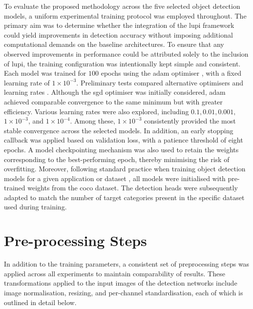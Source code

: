 To evaluate the proposed methodology across the five selected object detection models, a uniform experimental training protocol was employed throughout. The primary aim was to determine whether the integration of the \gls{lupi} framework could yield improvements in detection accuracy without imposing additional computational demands on the baseline architectures. To ensure that any observed improvements in performance could be attributed solely to the inclusion of \gls{lupi}, the training configuration was intentionally kept simple and consistent. Each model was trained for $100$ epochs using the \gls{adam} optimiser \cite{adam_optimizer}, with a fixed learning rate of \(1 \times 10^{-3}\).
Preliminary tests compared alternative optimisers and learning rates \cite{sgd_optimizer}. Although the \gls{sgd} optimiser was initially considered, \gls{adam} achieved comparable convergence to the same minimum but with greater efficiency. Various learning rates were also explored, including $0.1, 0.01, 0.001,$ \(1 \times 10^{-3}\), and \(1 \times 10^{-4}\). Among these, \(1 \times 10^{-3}\) consistently provided the most stable convergence across the selected models. 
In addition, an early stopping callback was applied based on validation loss, with a patience threshold of eight epochs. A model checkpointing mechanism was also used to retain the weights corresponding to the best-performing epoch, thereby minimising the risk of overfitting.
Moreover, following standard practice when training object detection models for a given application or dataset \cite{yolov12, soda_dataset, fasterrcnn, yolov10}, all models were initialised with pre-trained weights from the \gls{coco} dataset. The detection heads were subsequently adapted to match the number of target categories present in the specific dataset used during training.

\section{Pre-processing Steps}
\label{sec:4_preprocessing}

In addition to the training parameters, a consistent set of preprocessing steps was applied across all experiments to maintain comparability of results. These transformations applied to the input images of the detection networks include image normalisation, resizing, and per-channel standardisation, each of which is outlined in detail below.

